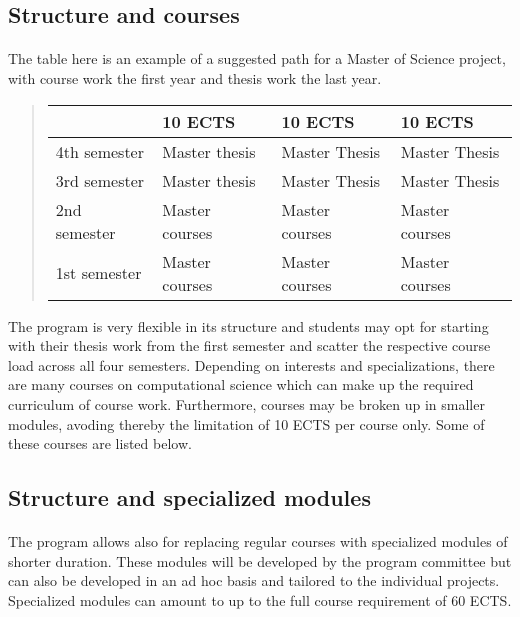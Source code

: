\documentclass[%
oneside,                 %
final,                   %
10pt]{article}
\begin{document}
\subsection*{Structure and courses}

\paragraph{}
The table here is an example of a suggested path for a Master of Science project,
with course work the first year and thesis work the last year.


\begin{quote}
\begin{tabular}{llll}
\hline
\multicolumn{1}{l}{  } & \multicolumn{1}{l}{ 10 ECTS } & \multicolumn{1}{l}{ 10 ECTS } & \multicolumn{1}{l}{ 10 ECTS } \\
\hline
4th semester & Master thesis  & Master Thesis  & Master Thesis  \\
\hline
3rd semester & Master thesis  & Master Thesis  & Master Thesis  \\
\hline
2nd semester & Master courses & Master courses & Master courses \\
\hline
1st semester & Master courses & Master courses & Master courses \\
\hline
\end{tabular}
\end{quote}

\noindent
The program is very flexible in its structure and students may opt for starting with their thesis
work from the first semester and scatter the respective course load across all four semesters.
Depending on interests and specializations, there are many courses on computational science which can make
up the required curriculum of course work. Furthermore, courses may be broken up in smaller modules,
avoding thereby the limitation of 10 ECTS per course only. Some of these courses are listed below.



\subsection*{Structure and specialized modules}

\paragraph{}
The program allows also for replacing regular courses with specialized modules of shorter duration.
These modules will be developed by the program committee but can also be developed in an ad hoc basis
and tailored to the individual projects. Specialized modules can amount to up to the full course requirement of 60 ECTS.
\end{document}
